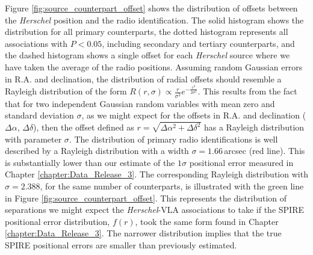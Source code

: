Figure \ref{fig:source_counterpart_offset} shows the distribution of offsets between the \textit{Herschel} position and the radio identification. The solid histogram shows the distribution for all primary counterparts, the dotted histogram represents all associations with $P < 0.05$, including secondary and tertiary counterparts, and the dashed histogram shows a single offset for each \textit{Herschel} source where we have taken the average of the radio positions. Assuming random Gaussian errors in R.A. and declination, the distribution of radial offsets should resemble a Rayleigh distribution of the form $R(r, \sigma) \propto \frac{r}{\sigma^2}e^{-\frac{r^2}{2\sigma^2}}$. This results from the fact that for two independent Gaussian random variables with mean zero and standard deviation $\sigma$, as we might expect for the offsets in R.A. and declination ($\Delta\alpha$, $\Delta\delta$), then the offset defined as $r = \sqrt{\Delta\alpha^2 + \Delta\delta^2}$ has a Rayleigh distribution with parameter $\sigma$. The distribution of primary radio identifications is well described by a Rayleigh distribution with a width $\sigma = 1.66\,$arcsec (red line). This is substantially lower than our estimate of the $1\sigma$ positional error measured in Chapter \ref{chapter:Data_Release_3}. The corresponding Rayleigh distribution with $\sigma = 2.388$, for the same number of counterparts, is illustrated with the green line in Figure \ref{fig:source_counterpart_offset}. This represents the distribution of separations we might expect the \textit{Herschel}-VLA associations to take if the SPIRE positional error distribution, $f(r)$, took the same form found in Chapter \ref{chapter:Data_Release_3}. The narrower distribution implies that the true SPIRE positional errors are smaller than previously estimated.

